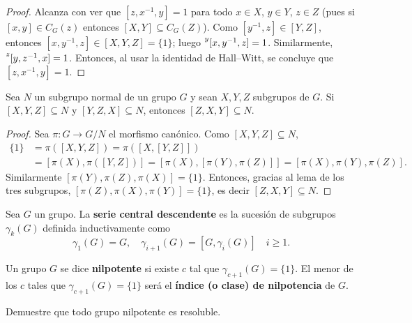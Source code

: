 \begin{proof}
	Alcanza con ver que $[z,x^{-1},y]=1$ para todo $x\in X$, $y\in Y$, $z\in Z$
	(pues si $[x,y]\in C_G(z)$ entonces %
	$[X,Y]\subseteq C_G(Z)$). Como $[y^{-1},z]\in [Y,Z]$, entonces
	$[x,y^{-1},z]\in [X,Y,Z]=\{1\}$; luego $\prescript{y}{}[x,y^{-1},z]=1$.
	Similarmente, $\prescript{z}{}[y,z^{-1},x]=1$. Entonces, al usar la
	identidad de Hall--Witt, se concluye que 
	$[z,x^{-1},y]=1$.
\end{proof}

\begin{lemma}
	\label{lemma:3subgrupos_general}
	Sea $N$ un subgrupo normal de un grupo $G$ y sean $X,Y,Z$
	subgrupos de $G$. Si $[X,Y,Z]\subseteq N$ y $[Y,Z,X]\subseteq N$, entonces 
	$[Z,X,Y]\subseteq N$.
\end{lemma}

\begin{proof}
	Sea $\pi\colon G\to G/N$ el morfismo canónico. Como $[X,Y,Z]\subseteq N$, 
	\begin{align*}
		\{1\}&=\pi([X,Y,Z])=\pi([ X,[Y,Z]])\\
		&=[\pi(X),\pi([Y,Z])]=[ \pi(X),[\pi(Y),\pi(Z)]]=[\pi(X),\pi(Y),\pi(Z)]. 
	\end{align*}
	Similarmente $[\pi(Y),\pi(Z),\pi(X)]=\{1\}$. Entonces, gracias al lema de los
	tres subgrupos, $[\pi(Z),\pi(X),\pi(Y)]=\{1\}$, es decir
	$[Z,X,Y]\subseteq N$.
\end{proof}


\begin{definition}
	Sea $G$ un grupo. La \textbf{serie central descendente} es la sucesión de
	subgrupos $\gamma_k(G)$ definida inductivamente como
	\[
		\gamma_1(G)=G,\quad
		\gamma_{i+1}(G)=[G,\gamma_i(G)]\quad i\geq 1.
	\]
\end{definition}

\begin{definition}
	Un grupo $G$ se dice \textbf{nilpotente} si existe $c$ tal que
	$\gamma_{c+1}(G)=\{1\}$. El menor de los $c$ tales que $\gamma_{c+1}(G)=\{1\}$ será
	el \textbf{índice (o clase) de nilpotencia} de $G$.
\end{definition}

\begin{exercise}
\label{xca:nilpotente=>resoluble}
	Demuestre que todo grupo nilpotente es resoluble.
\end{exercise}


